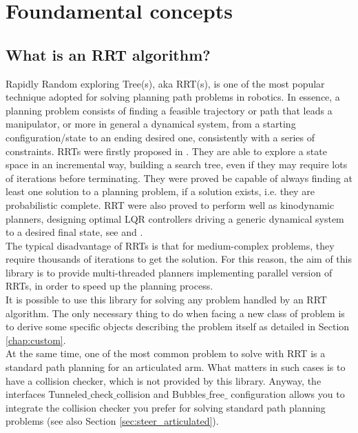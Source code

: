 \chapter{Foundamental concepts}

\section{What is an RRT algorithm?}

Rapidly Random exploring Tree(s), aka RRT(s), is one of the most popular technique adopted for solving planning path problems in robotics.
In essence, a planning problem consists of finding a feasible trajectory or path that leads a manipulator, or more in general a dynamical system, from a starting configuration/state to an ending desired one, consistently with a series of constraints.
RRTs were firstly proposed in \cite{RRT_LaValle}. They are able to explore a state space in an incremental way, building a search tree, even if they may require lots of iterations before terminating. They were proved be capable of always finding at least one solution to a planning problem, if a solution exists, i.e. they are probabilistic complete.
RRT were also proved to perform well as kinodynamic planners, designing optimal LQR controllers driving a generic dynamical system to a desired final state, see \cite{LQR_RRT_01} and  \cite{LQR_RRT_02}.
\\
The typical disadvantage of RRTs is that for medium-complex problems, they require thousands of iterations to get the solution. 
For this reason, the aim of this library is to provide multi-threaded planners implementing parallel version of RRTs, in order to speed up the planning process. 
\\
It is possible to use this library for solving any problem handled by an RRT algorithm. The only necessary thing to do when facing a new class of problem is to derive some specific objects describing the problem itself as detailed in Section \ref{chap:custom}.
\\
At the same time, one of the most common problem to solve with RRT is a standard path planning for an articulated arm.
What matters in such cases is to have a collision checker, which is not provided by this library. Anyway, the interfaces Tunneled$\_$check$\_$collision and Bubbles$\_$free$\_$ configuration allows you to integrate the collision checker you prefer for solving standard path planning problems (see also Section \ref{sec:steer_articulated}).
\\
\\
